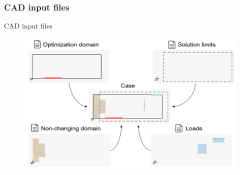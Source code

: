 \subsubsection{CAD input files}
\begin{frame}{CAD input files}

\begin{figure}
\centering
\includegraphics[width=.72\textwidth]{Pictures/SecondHalf/four_files.png}
\end{figure}
\end{frame}

